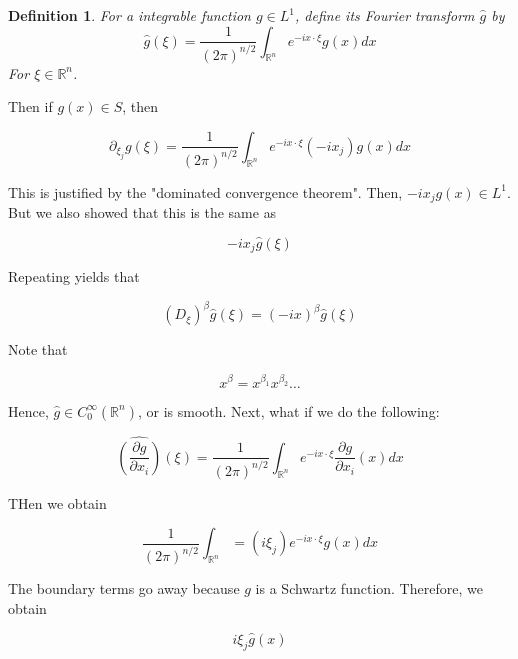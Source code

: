\documentclass{article}
\newtheorem{definition}[theorem]{Definition}
\newtheorem{one minute paper}[theorem]{One Minute Paper}
\begin{document}
\begin{definition}
    For a integrable function $g \in L^1$, define its Fourier transform $\hat{g}$ by 
    \begin{equation}
        \hat{g}(\xi) = \frac{1}{\left( 2\pi \right)^{n/2}}\int_{\mathbb{R}^n}e^{-ix \cdot \xi} g(x) dx
    \end{equation}
    For $\xi \in \mathbb{R}^n$. 
\end{definition}

Then if $g(x) \in S$, then 

\begin{equation}
    \partial_{\xi_j}g(\xi) = \frac{1}{(2\pi)^{n/2}}\int_{\mathbb{R}^n}e^{-i x \cdot \xi}(-i x_j) g(x)dx
\end{equation}

This is justified by the "dominated convergence theorem". Then, $-ix_j g(x) \in L^1$. But we also showed that this is the same as 

\begin{equation}
    -i x_j \hat{g}(\xi)
\end{equation}

Repeating yields that 

\begin{equation}
    (D_{\xi})^{\beta}\hat{g}(\xi) = (-ix)^{\beta}\hat{g}(\xi)
\end{equation}

Note that 

\begin{equation}
    x^{\beta} = x^{\beta_1}x^{\beta_2}\dots
\end{equation}

Hence, $\hat{g} \in C_{0}^{\infty}(\mathbb{R}^n)$, or is smooth. Next, what if we do the following:

\begin{equation}
    \hat{\left( \frac{\partial g}{\partial x_i} \right)}(\xi) = \frac{1}{\left( 2\pi \right)^{n/2}}\int_{\mathbb{R}^n}e^{-ix \cdot \xi}\frac{\partial g}{\partial x_i}(x)dx
\end{equation}

THen we obtain 

\begin{equation}
    \frac{1}{(2\pi)^{n/2}}\int_{\mathbb{R}^n} = (i \xi_j)e^{-ix \cdot \xi}g(x)dx
\end{equation}

The boundary terms go away because $g$ is a Schwartz function. Therefore, we obtain 

\begin{equation}
    i\xi_j\hat{g}(x)
\end{equation}
\end{document}
